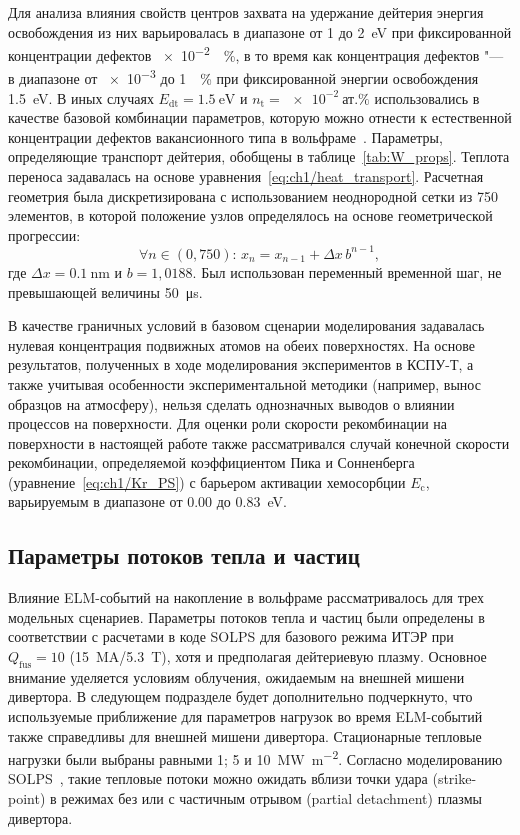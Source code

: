 Для анализа влияния свойств центров захвата на удержание дейтерия энергия освобождения из них варьировалась в диапазоне от \num{1} до \SI{2}{\electronvolt} при фиксированной концентрации дефектов \SI{e-2}{\percent}, в то время как концентрация дефектов "--- в диапазоне от \num{e-3} до \SI{1}{\percent} при фиксированной энергии освобождения \SI{1.5}{\electronvolt}. В иных случаях $E_{\mathrm{dt}}=\SI{1.5}{\electronvolt}$ и $n_{\mathrm{t}}=\SI{e-2}{\text{ат.}\percent}$ использовались в качестве базовой комбинации параметров, которую можно отнести к естественной концентрации дефектов вакансионного типа в вольфраме~\cite{DeTemmerman2018}. Параметры, определяющие транспорт дейтерия, обобщены в таблице~\cref{tab:W_props}. Теплота переноса задавалась на основе уравнения~\cref{eq:ch1/heat_transport}. Расчетная геометрия была дискретизирована с использованием неоднородной сетки из 750 элементов, в которой положение узлов определялось на основе геометрической прогрессии:
\[
	\forall n\in(0,750):\,x_{n}=x_{n-1}+\Delta x\,b^{n-1},
\]
где $\Delta x=\SI{0.1}{\nano\meter}$ и $b=1,0188$. Был использован переменный временной шаг, не превышающей величины \SI{50}{\micro\second}.

В качестве граничных условий в базовом сценарии моделирования задавалась нулевая концентрация подвижных атомов на обеих поверхностях. На основе результатов, полученных в ходе моделирования экспериментов в КСПУ-Т, а также учитывая особенности экспериментальной методики (например, вынос образцов на атмосферу), нельзя сделать однозначных выводов о влиянии процессов на поверхности. Для оценки роли скорости рекомбинации на поверхности в настоящей работе также рассматривался случай конечной скорости рекомбинации, определяемой коэффициентом Пика и Сонненберга (уравнение~\cref{eq:ch1/Kr_PS}) с барьером активации хемосорбции \( E_\mathrm{c} \), варьируемым в диапазоне от \num{0.00} до \SI{0.83}{\electronvolt}.

\subsection{Параметры потоков тепла и частиц}
Влияние ELM-событий на накопление в вольфраме рассматривалось для трех модельных сценариев. Параметры потоков тепла и частиц были определены в соответствии с расчетами в коде SOLPS для базового режима ИТЭР при $Q_\mathrm{fus}=\num{10}$ (\SI{15}{\mega\ampere}/\SI{5.3}{\tesla}), хотя и предполагая дейтериевую плазму. Основное внимание уделяется условиям облучения, ожидаемым на внешней мишени дивертора. В следующем подразделе будет дополнительно подчеркнуто, что используемые приближение для параметров нагрузок во время ELM-событий также справедливы для внешней мишени дивертора. Стационарные тепловые нагрузки были выбраны равными 1; 5 и \SI{10}{\mega\watt\per\meter\squared}. Согласно моделированию SOLPS~\cite{Pitts2019, Orrico2023}, такие тепловые потоки можно ожидать вблизи точки удара (strike-point) в режимах без или с частичным отрывом (partial detachment) плазмы дивертора.

